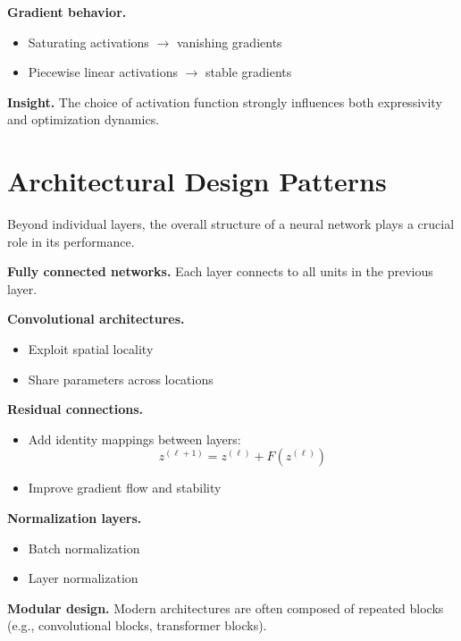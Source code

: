 \medskip

\noindent
\textbf{Gradient behavior.}
\begin{itemize}
    \item Saturating activations $\rightarrow$ vanishing gradients
    \item Piecewise linear activations $\rightarrow$ stable gradients
\end{itemize}

\medskip

\noindent
\textbf{Insight.}  
The choice of activation function strongly influences both expressivity and optimization dynamics.

\section{Architectural Design Patterns}

Beyond individual layers, the overall structure of a neural network plays a crucial role in its performance.

\medskip

\noindent
\textbf{Fully connected networks.}  
Each layer connects to all units in the previous layer.

\medskip

\noindent
\textbf{Convolutional architectures.}
\begin{itemize}
    \item Exploit spatial locality
    \item Share parameters across locations
\end{itemize}

\medskip

\noindent
\textbf{Residual connections.}
\begin{itemize}
    \item Add identity mappings between layers:
    \[
    z^{(\ell+1)} = z^{(\ell)} + F(z^{(\ell)})
    \]
    \item Improve gradient flow and stability
\end{itemize}

\medskip

\noindent
\textbf{Normalization layers.}
\begin{itemize}
    \item Batch normalization
    \item Layer normalization
\end{itemize}

\medskip

\noindent
\textbf{Modular design.}  
Modern architectures are often composed of repeated blocks (e.g., convolutional blocks, transformer blocks).

